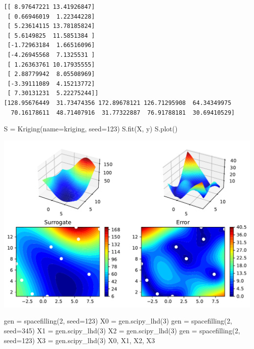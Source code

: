 \documentclass[
  letterpaper,
  DIV=11,
  numbers=noendperiod]{scrreprt}
\newenvironment{Shaded}{\begin{snugshade}}{\end{snugshade}}
\newcommand{\DecValTok}[1]{\textcolor[rgb]{0.68,0.00,0.00}{#1}}
\newcommand{\NormalTok}[1]{\textcolor[rgb]{0.00,0.23,0.31}{#1}}
\newcommand{\OperatorTok}[1]{\textcolor[rgb]{0.37,0.37,0.37}{#1}}
\newcommand{\StringTok}[1]{\textcolor[rgb]{0.13,0.47,0.30}{#1}}
\begin{document}
\begin{verbatim}
[[ 8.97647221 13.41926847]
 [ 0.66946019  1.22344228]
 [ 5.23614115 13.78185824]
 [ 5.6149825  11.5851384 ]
 [-1.72963184  1.66516096]
 [-4.26945568  7.1325531 ]
 [ 1.26363761 10.17935555]
 [ 2.88779942  8.05508969]
 [-3.39111089  4.15213772]
 [ 7.30131231  5.22275244]]
[128.95676449  31.73474356 172.89678121 126.71295908  64.34349975
  70.16178611  48.71407916  31.77322887  76.91788181  30.69410529]
\end{verbatim}

\begin{Shaded}
\begin{Highlighting}[]
\NormalTok{S }\OperatorTok{=}\NormalTok{ Kriging(name}\OperatorTok{=}\StringTok{\textquotesingle{}kriging\textquotesingle{}}\NormalTok{,  seed}\OperatorTok{=}\DecValTok{123}\NormalTok{)}
\NormalTok{S.fit(X, y)}
\NormalTok{S.plot()}
\end{Highlighting}
\end{Shaded}

\includegraphics{012_num_spot_ei_files/figure-pdf/cell-21-output-1.pdf}

\begin{Shaded}
\begin{Highlighting}[]
\NormalTok{gen }\OperatorTok{=}\NormalTok{ spacefilling(}\DecValTok{2}\NormalTok{, seed}\OperatorTok{=}\DecValTok{123}\NormalTok{)}
\NormalTok{X0 }\OperatorTok{=}\NormalTok{ gen.scipy\_lhd(}\DecValTok{3}\NormalTok{)}
\NormalTok{gen }\OperatorTok{=}\NormalTok{ spacefilling(}\DecValTok{2}\NormalTok{, seed}\OperatorTok{=}\DecValTok{345}\NormalTok{)}
\NormalTok{X1 }\OperatorTok{=}\NormalTok{ gen.scipy\_lhd(}\DecValTok{3}\NormalTok{)}
\NormalTok{X2 }\OperatorTok{=}\NormalTok{ gen.scipy\_lhd(}\DecValTok{3}\NormalTok{)}
\NormalTok{gen }\OperatorTok{=}\NormalTok{ spacefilling(}\DecValTok{2}\NormalTok{, seed}\OperatorTok{=}\DecValTok{123}\NormalTok{)}
\NormalTok{X3 }\OperatorTok{=}\NormalTok{ gen.scipy\_lhd(}\DecValTok{3}\NormalTok{)}
\NormalTok{X0, X1, X2, X3}
\end{Highlighting}
\end{Shaded}
\end{document}
